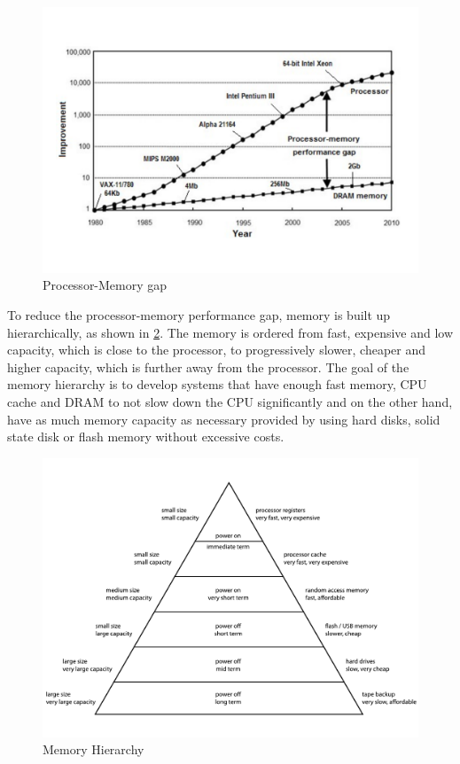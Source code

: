 \documentclass[
	12pt,
	a4paper,
	abstract,
	bibliography=totoc,
	chapterprefix,
	headings=openright,
	numbers=endperiod,
	parskip=half,
	twoside,
]{scrreprt}
\begin{document}
\begin{figure}[ht]
	\centering
	\includegraphics[scale=0.45]{processor_memory_gap.pdf}
	\caption{Processor-Memory gap \cite{cpu-mem-gap}}
		\label{fig:processor memory gap}
\end{figure}


To reduce the processor-memory performance gap, memory is built up hierarchically, as shown in \cref{fig:memory hierarchy}.
The memory is ordered from fast, expensive and low capacity, which is close to the processor, to progressively slower, cheaper and higher capacity, which is further away from the processor.
The goal of the memory hierarchy is to develop systems that have enough fast memory, CPU cache and DRAM to not slow down the CPU significantly and on the other hand, have as much memory capacity as necessary provided by using hard disks, solid state disk or flash memory without excessive costs.

\begin{figure}[ht]
	\centering
	\includegraphics[scale=0.6]{ComputerMemoryHierarchy.pdf}
	\caption{Memory Hierarchy \cite{wiki:xxx}}
		\label{fig:memory hierarchy}
\end{figure}
\end{document}
